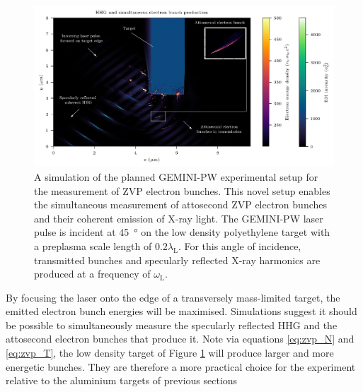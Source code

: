 \begin{figure}
	\centering
	\includegraphics[width=1\linewidth]{figures/zvp/Experiment_setup_HHG_bunches2}
	\caption[Planned GEMINI-PW experimental setup for the measurement of ZVP electron bunches.]{A simulation of the planned GEMINI-PW experimental setup for the measurement of ZVP electron bunches. This novel setup enables the simultaneous measurement of attosecond ZVP electron bunches and their coherent emission of X-ray light. The GEMINI-PW laser pulse is incident at \qty{45}{\degree} on the low density polyethylene target with a preplasma scale length of $0.2\lambda_\mathrm{L}$. For this angle of incidence, transmitted bunches and specularly reflected X-ray harmonics are produced at a frequency of $\omega_\mathrm{L}$.}
	\label{fig:experimentsetuphhgbunches2}
\end{figure}
By focusing the laser onto the edge of a transversely mass-limited target, the emitted electron bunch energies will be maximised. Simulations suggest it should be possible to simultaneously measure the specularly reflected \ac{HHG} and the attosecond electron bunches that produce it. Note via equations \ref{eq:zvp_N} and \ref{eq:zvp_T}, the low density target of Figure \ref{fig:experimentsetuphhgbunches2} will produce larger and more energetic bunches. They are therefore a more practical choice for the experiment relative to the aluminium targets of previous sections

